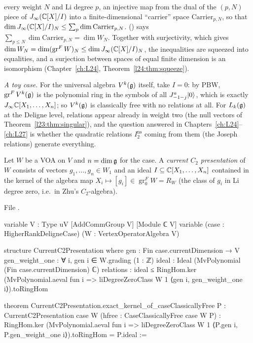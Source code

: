 \begin{itemize}
  every weight $N$ and Li degree $p$, an injective map from the dual of the $(p,N)$ piece of $J_\infty({\mathbb{C}}[X]/I)$ into a finite-dimensional
  ``carrier'' space $\mathrm{Carrier}_{p,N}$, so that $\dim J_\infty({\mathbb{C}}[X]/I)_N\le\sum_p\dim\mathrm{Carrier}_{p,N}$.
   () says $\sum_{p\le N}\dim\mathrm{Carrier}_{p,N}=\dim W_N$. Together with surjectivity, which gives
  $\dim W_N=\dim(\operatorname{gr}^FW)_N\le\dim J_\infty({\mathbb{C}}[X]/I)_N$, the inequalities are squeezed into equalities, and a surjection between spaces
  of equal finite dimension is an isomorphism (Chapter~\ref{ch:L24}, Theorem~\ref{l24:thm:squeeze}).
\end{itemize}
\emph{A toy case.} For the universal algebra $V^k(\mathfrak g)$ itself, take $I=0$: by PBW, $\operatorname{gr}^FV^k(\mathfrak g)$ is the polynomial ring
in the symbols of all $J^a_{-1-j}|0\rangle$, which is exactly $J_\infty{\mathbb{C}}[X_1,\dots,X_n]$; so $V^k(\mathfrak g)$ is classically free with no
relations at all. For $L_k(\mathfrak g)$ at the Deligne level, relations appear already in weight two (the null vectors of
Theorem~\ref{l23:thm:singular}), and the question answered in Chapters~\ref{ch:L24}--\ref{ch:L27} is whether the quadratic relations
$I_2^{\mathrm{ns}}$ coming from them (the Joseph relations) generate everything.

\begin{definition}\label{l23:def:c2pres}
Let $W$ be a VOA on $V$ and $n=\dim\mathfrak g$ for the case. A \emph{current $C_2$ presentation} of $W$ consists of vectors
$g_1,\dots,g_n\in W_1$ and an ideal $I\subseteq{\mathbb{C}}[X_1,\dots,X_n]$ contained in the kernel of the algebra map
$X_i\mapsto[g_i]\in\operatorname{gr}^F_0W=R_W$ (the class of $g_i$ in Li degree zero, i.e.\ in Zhu's $C_2$-algebra).
\end{definition}
\noindent File .
\begin{leancode}
variable {V : Type uV} [AddCommGroup V] [Module ℂ V]
variable (case : HigherRankDeligneCase) (W : VertexOperatorAlgebra V)

structure CurrentC2Presentation where
  gen : Fin case.currentDimension → V
  gen_weight_one : ∀ i, gen i ∈ W.grading (1 : ℤ)
  ideal : Ideal (MvPolynomial (Fin case.currentDimension) ℂ)
  relations : ideal ≤ RingHom.ker
      (MvPolynomial.aeval fun i =>
        liDegreeZeroClass W 1 ⟨gen i, gen_weight_one i⟩).toRingHom

theorem CurrentC2Presentation.exact_kernel_of_caseClassicallyFree
    {P : CurrentC2Presentation case W} (hfree : CaseClassicallyFree case W P) :
    RingHom.ker
        (MvPolynomial.aeval fun i =>
          liDegreeZeroClass W 1 ⟨P.gen i, P.gen_weight_one i⟩).toRingHom =
      P.ideal :=
\end{leancode}

